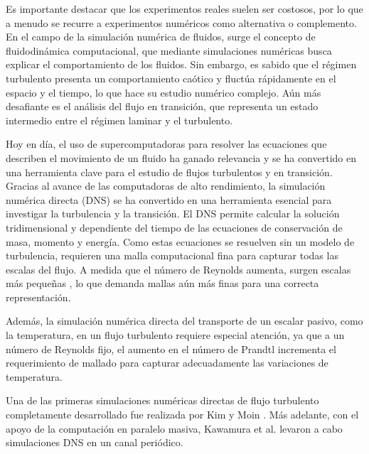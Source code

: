 Es importante destacar que los experimentos reales suelen ser costosos, por lo que a menudo se recurre a experimentos numéricos como alternativa o complemento. En el campo de la simulación numérica de fluidos, surge el concepto de fluidodinámica computacional, que mediante simulaciones numéricas busca explicar el comportamiento de los fluidos. Sin embargo, es sabido que el régimen turbulento presenta un comportamiento caótico y fluctúa rápidamente en el espacio y el tiempo, lo que hace su estudio numérico complejo. Aún más desafiante es el análisis del flujo en transición, que representa un estado intermedio entre el régimen laminar y el turbulento.

Hoy en día, el uso de supercomputadoras para resolver las ecuaciones que describen el movimiento de un fluido ha ganado relevancia y se ha convertido en una herramienta clave para el estudio de flujos turbulentos y en transición. Gracias al avance de las computadoras de alto rendimiento, la simulación numérica directa (DNS) se ha convertido en una herramienta esencial para investigar la turbulencia y la transición. El DNS permite calcular la solución tridimensional y dependiente del tiempo de las ecuaciones de conservación de masa, momento y energía. Como estas ecuaciones se resuelven sin un modelo de turbulencia, requieren una malla computacional fina para capturar todas las escalas del flujo. A medida que el número de Reynolds aumenta, surgen escalas más pequeñas \cite{pope2001turbulent}, lo que demanda mallas aún más finas para una correcta representación.

Además, la simulación numérica directa del transporte de un escalar pasivo, como la temperatura, en un flujo turbulento requiere especial atención, ya que a un número de Reynolds fijo, el aumento en el número de Prandtl incrementa el requerimiento de mallado para capturar adecuadamente las variaciones de temperatura.

Una de las primeras simulaciones numéricas directas de flujo turbulento completamente desarrollado fue realizada por Kim y Moin \cite{kim1989transport}. Más adelante, con el apoyo de la computación en paralelo masiva, Kawamura et al. \cite{kawamura2000dns} levaron a cabo simulaciones DNS en un canal periódico. %

